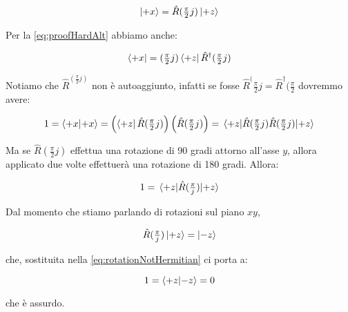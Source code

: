 	\begin{equation}
		\ket{+x} = \hat{R}(\tfrac{\pi}{2} j) \ket{+z}
	\end{equation} 

Per la \eqref{eq:proofHardAlt} abbiamo anche:

	\begin{equation}
		\bra{+x} = (\tfrac{\pi}{2} j) \bra{+z} \hat{R}^\dagger(\tfrac{\pi}{2} j)
	\end{equation}

	Notiamo che $ \hat{R}^(\tfrac{\pi}{2} j) $ non \`e autoaggiunto, infatti se fosse $ \hat{R}^(\tfrac{\pi}{2} j = \hat{R}^\dagger(\tfrac{\pi}{2}$ dovremmo avere:
	
	\begin{equation}
	 	1 = \braket{+x}{+x} = \left( \bra{+z} \hat{R}(\tfrac{\pi}{2} j) \right ) \left (\hat{R}(\tfrac{\pi}{2} j) \right ) = \mel{+z}{\hat{R}(\tfrac{\pi}{2} j)\hat{R}(\tfrac{\pi}{2} j) }{+z} 
	\end{equation} 

Ma se $ \hat{R}(\tfrac{\pi}{2} j )$ effettua una rotazione di 90 gradi attorno all'asse $y$, allora applicato due volte effettuer\`a una rotazione di 180 gradi. Allora:

	\begin{equation} \label{eq:rotationNotHermitian}
		1 = \mel{+z}{\hat{R}(\tfrac{\pi} j ) }{+z}
	\end{equation}

Dal momento che stiamo parlando di rotazioni sul piano $xy$,

	\begin{equation}
		\hat{R}(\tfrac{\pi} j ) \ket{+z} = \ket{-z}
	\end{equation}

che, sostituita nella \eqref{eq:rotationNotHermitian} ci porta a:

	\begin{equation}
		1 = \braket{+z}{-z} = 0
	\end{equation}

che \`e assurdo.
